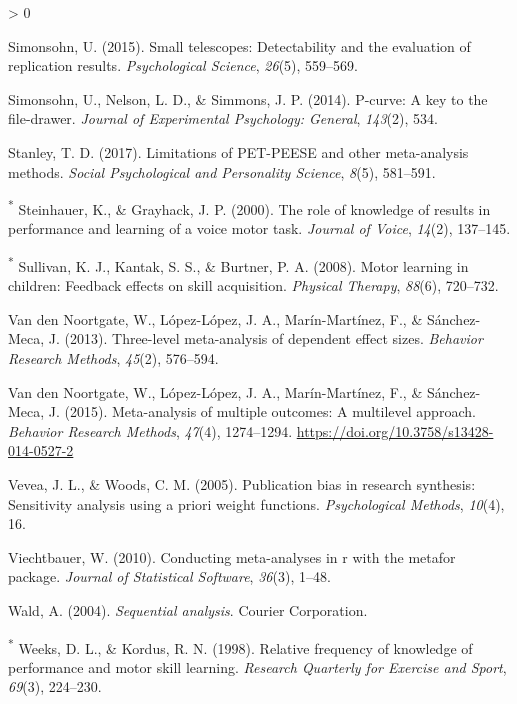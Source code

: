 \documentclass[
  english,
  man, donotrepeattitle,mask,floatsintext]{apa7}
\newlength{\cslhangindent}
\newenvironment{CSLReferences}[2] %
 {%
  \setlength{\parindent}{0pt}
  \ifodd #1 \everypar{\setlength{\hangindent}{\cslhangindent}}\ignorespaces\fi
  \ifnum #2 > 0
  \setlength{\parskip}{#2\baselineskip}
  \fi
 }%
 {}
\begin{document}
\begin{CSLReferences}{1}{0}
\leavevmode\hypertarget{ref-Simonsohn2015}{}%
Simonsohn, U. (2015). Small telescopes: Detectability and the evaluation of replication results. \emph{Psychological Science}, \emph{26}(5), 559--569.

\leavevmode\hypertarget{ref-Simonsohn2014}{}%
Simonsohn, U., Nelson, L. D., \& Simmons, J. P. (2014). P-curve: A key to the file-drawer. \emph{Journal of Experimental Psychology: General}, \emph{143}(2), 534.

\leavevmode\hypertarget{ref-Stanley2017}{}%
Stanley, T. D. (2017). Limitations of PET-PEESE and other meta-analysis methods. \emph{Social Psychological and Personality Science}, \emph{8}(5), 581--591.

\leavevmode\hypertarget{ref-Steinhauer2000}{}%
\textsuperscript{*} Steinhauer, K., \& Grayhack, J. P. (2000). The role of knowledge of results in performance and learning of a voice motor task. \emph{Journal of Voice}, \emph{14}(2), 137--145.

\leavevmode\hypertarget{ref-Sullivan2008}{}%
\textsuperscript{*} Sullivan, K. J., Kantak, S. S., \& Burtner, P. A. (2008). Motor learning in children: Feedback effects on skill acquisition. \emph{Physical Therapy}, \emph{88}(6), 720--732.

\leavevmode\hypertarget{ref-VandenNoortgate2013}{}%
Van den Noortgate, W., López-López, J. A., Marín-Martínez, F., \& Sánchez-Meca, J. (2013). Three-level meta-analysis of dependent effect sizes. \emph{Behavior Research Methods}, \emph{45}(2), 576--594.

\leavevmode\hypertarget{ref-VandenNoortgate2015}{}%
Van den Noortgate, W., López-López, J. A., Marín-Martínez, F., \& Sánchez-Meca, J. (2015). Meta-analysis of multiple outcomes: A multilevel approach. \emph{Behavior Research Methods}, \emph{47}(4), 1274--1294. \url{https://doi.org/10.3758/s13428-014-0527-2}

\leavevmode\hypertarget{ref-Vevea2005}{}%
Vevea, J. L., \& Woods, C. M. (2005). Publication bias in research synthesis: Sensitivity analysis using a priori weight functions. \emph{Psychological Methods}, \emph{10}(4), 16.

\leavevmode\hypertarget{ref-Viechtbauer2010}{}%
Viechtbauer, W. (2010). Conducting meta-analyses in r with the metafor package. \emph{Journal of Statistical Software}, \emph{36}(3), 1--48.

\leavevmode\hypertarget{ref-Wald2004}{}%
Wald, A. (2004). \emph{Sequential analysis}. Courier Corporation.

\leavevmode\hypertarget{ref-Weeks1998}{}%
\textsuperscript{*} Weeks, D. L., \& Kordus, R. N. (1998). Relative frequency of knowledge of performance and motor skill learning. \emph{Research Quarterly for Exercise and Sport}, \emph{69}(3), 224--230.


\end{CSLReferences}
\end{document}
